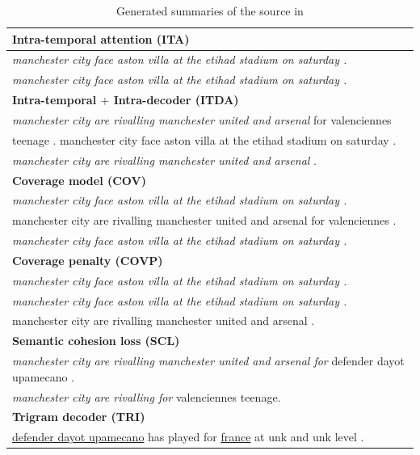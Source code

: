\begin{table}[th!]
\begin{center}
\scriptsize
\caption{\label{tab:strong_methods} Generated summaries of the source in }
\begin{tabular}{|l|}%

\hline \bf Intra-temporal attention (ITA) \\
\hline \textit{manchester city face aston villa at the etihad stadium on saturday .} \\
	   \textit{manchester city face aston villa at the etihad stadium on saturday .}\\
\hline \bf Intra-temporal $+$ Intra-decoder (ITDA) \\
\hline \textit{manchester city are rivalling manchester united and arsenal }for valenciennes\\
       teenage . manchester city face aston villa at the etihad stadium on saturday . \\
	   \textit{manchester city are rivalling manchester united and arsenal }. \\
\hline \bf Coverage model (COV) \\
\hline \textit{manchester city face aston villa at the etihad stadium on saturday .} \\
       manchester city are rivalling manchester united and arsenal for valenciennes . \\
	   \textit{manchester city face aston villa at the etihad stadium on saturday .}\\
\hline \bf Coverage penalty (COVP)\\
\hline \textit{manchester city face aston villa at the etihad stadium on saturday .}\\
       \textit{manchester city face aston villa at the etihad stadium on saturday .}\\
	   manchester city are rivalling manchester united and arsenal .\\
\hline \bf Semantic cohesion loss (SCL) \\
\hline \textit{manchester city are rivalling manchester united and arsenal for } defender dayot upamecano . \\
       \textit{manchester city are rivalling for} valenciennes teenage. \\
\hline \bf Trigram decoder (TRI) \\
\hline \underline{defender dayot upamecano} has played for \underline{france} at unk and unk level .\\ 

\end{tabular}
\end{center}
\end{table}
